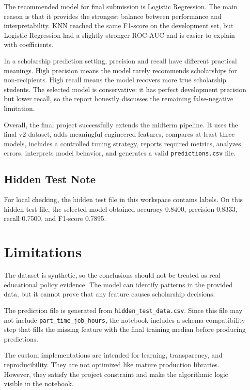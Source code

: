 ﻿\documentclass[12pt,a4paper]{article}
\begin{document}
The recommended model for final submission is Logistic Regression. The main reason is that it provides the strongest balance between performance and interpretability. KNN reached the same F1-score on the development set, but Logistic Regression had a slightly stronger ROC-AUC and is easier to explain with coefficients.

In a scholarship prediction setting, precision and recall have different practical meanings. High precision means the model rarely recommends scholarships for non-recipients. High recall means the model recovers more true scholarship students. The selected model is conservative: it has perfect development precision but lower recall, so the report honestly discusses the remaining false-negative limitation.

Overall, the final project successfully extends the midterm pipeline. It uses the final v2 dataset, adds meaningful engineered features, compares at least three models, includes a controlled tuning strategy, reports required metrics, analyzes errors, interprets model behavior, and generates a valid \texttt{predictions.csv} file.

\subsection{Hidden Test Note}

For local checking, the hidden test file in this workspace contains labels. On this hidden test file, the selected model obtained accuracy 0.8400, precision 0.8333, recall 0.7500, and F1-score 0.7895.

\clearpage

\section{Limitations}

The dataset is synthetic, so the conclusions should not be treated as real educational policy evidence. The model can identify patterns in the provided data, but it cannot prove that any feature causes scholarship decisions.

The prediction file is generated from \texttt{hidden\_test\_data.csv}. Since this file may not include \texttt{part\_time\_job\_hours}, the notebook includes a schema-compatibility step that fills the missing feature with the final training median before producing predictions.

The custom implementations are intended for learning, transparency, and reproducibility. They are not optimized like mature production libraries. However, they satisfy the project constraint and make the algorithmic logic visible in the notebook.
\end{document}
